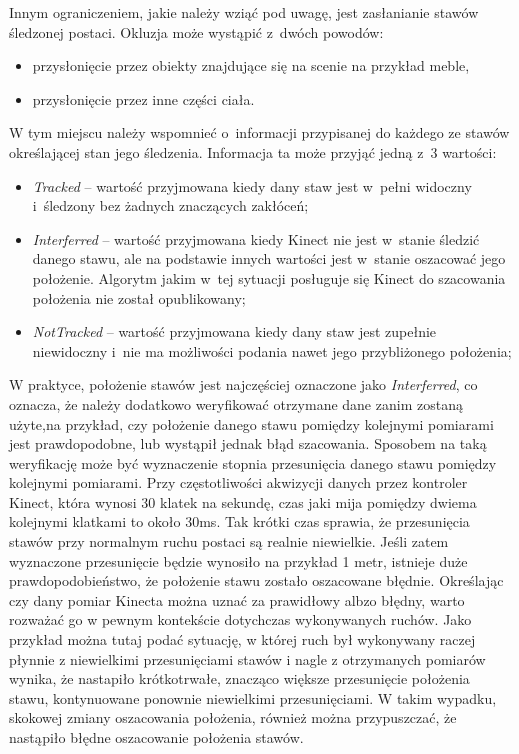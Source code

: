 Innym ograniczeniem, jakie należy wziąć pod uwagę, jest zasłanianie stawów śledzonej postaci. Okluzja może wystąpić z~dwóch powodów:
\begin{itemize}
	\item przysłonięcie przez obiekty znajdujące się na scenie na przykład meble,
	\item przysłonięcie przez inne części ciała.
\end{itemize}
																																			
W tym miejscu należy wspomnieć o~informacji przypisanej do każdego ze stawów określającej stan jego śledzenia. Informacja ta może przyjąć jedną z~3 wartości:
\begin{itemize}
	\item \emph{Tracked} -- wartość przyjmowana kiedy dany staw jest w~pełni widoczny i~śledzony bez żadnych znaczących zakłóceń;
	\item \emph{Interferred} -- wartość przyjmowana kiedy Kinect nie jest w~stanie śledzić danego stawu, ale na podstawie innych wartości jest w~stanie oszacować jego położenie. Algorytm jakim w~tej sytuacji posługuje się Kinect do szacowania położenia nie został opublikowany;
	\item \emph{NotTracked} -- wartość przyjmowana kiedy dany staw jest zupełnie niewidoczny i~nie ma możliwości podania nawet jego przybliżonego położenia;
\end{itemize}
																																			
W praktyce, położenie stawów jest najczęściej oznaczone jako \emph{Interferred}, co oznacza, że należy dodatkowo weryfikować otrzymane dane zanim zostaną użyte,na przykład, czy położenie danego stawu pomiędzy kolejnymi pomiarami jest prawdopodobne, lub wystąpił jednak błąd szacowania. Sposobem na taką weryfikację może być wyznaczenie stopnia przesunięcia danego stawu pomiędzy kolejnymi pomiarami. Przy częstotliwości akwizycji danych przez kontroler Kinect, która wynosi 30 klatek na sekundę, czas jaki mija pomiędzy dwiema kolejnymi klatkami to około 30ms. Tak krótki czas sprawia, że przesunięcia stawów przy normalnym ruchu postaci są realnie niewielkie. Jeśli zatem wyznaczone przesunięcie będzie wynosiło na przykład 1 metr, istnieje duże prawdopodobieństwo, że położenie stawu zostało oszacowane błędnie. Określając czy dany pomiar Kinecta można uznać za prawidłowy albzo błędny, warto rozważać go w pewnym kontekście dotychczas wykonywanych ruchów. Jako przykład można tutaj podać sytuację, w której ruch był wykonywany raczej płynnie z niewielkimi przesunięciami stawów i nagle z otrzymanych pomiarów wynika, że nastapiło krótkotrwałe, znacząco większe przesunięcie położenia stawu, kontynuowane ponownie niewielkimi przesunięciami. W takim wypadku, skokowej zmiany oszacowania położenia, również można przypuszczać, że nastąpiło błędne oszacowanie położenia stawów.
																																			
